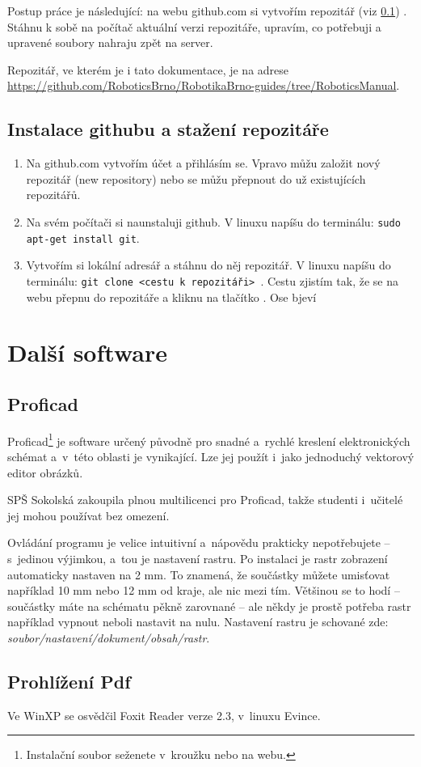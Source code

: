 Postup práce je následující: na webu github.com si vytvořím repozitář (viz \ref{instal_github}) . Stáhnu k sobě na počítač aktuální verzi repozitáře, upravím, co potřebuji a upravené soubory nahraju zpět na server. 

Repozitář, ve kterém je i tato dokumentace, je na adrese 
\url{https://github.com/RoboticsBrno/RobotikaBrno-guides/tree/RoboticsManual}.  


\subsection{Instalace githubu a stažení repozitáře} \label{instal_github}

\begin{enumerate}
	\item Na github.com vytvořím účet a přihlásím se. Vpravo můžu založit nový repozitář (new repository) nebo se můžu přepnout do už existujících repozitářů. 
	
	\item Na svém počítači si naunstaluji github. V linuxu napíšu do terminálu: {\tt sudo apt-get install git}.  
	
	\item Vytvořím si lokální adresář a stáhnu do něj repozitář. V linuxu napíšu do terminálu: {\tt git clone <cestu k repozitáři> }. 
	Cestu zjistím tak, že se na webu přepnu do repozitáře a kliknu na tlačítko . Ose bjeví 
\end{enumerate}


 
\section{Další software}

\subsection{Proficad}

Proficad\footnote{Instalační soubor seženete v~kroužku nebo na webu.} 
je software určený původně pro snadné a~rychlé kreslení elektronických schémat a~v~této oblasti je vynikající. 
Lze jej použít i~jako jednoduchý vektorový editor obrázků. 

SPŠ Sokolská zakoupila plnou multilicenci pro Proficad, takže studenti i~učitelé jej mohou používat bez omezení. 

Ovládání programu je velice intuitivní a~nápovědu prakticky nepotřebujete -- s~jedinou výjimkou, a~tou je nastavení rastru. 
Po instalaci je rastr zobrazení automaticky nastaven na 2 mm. To znamená, že součástky 
můžete umisťovat například 10 mm nebo 12 mm od kraje, ale nic mezi tím. 
Většinou se to hodí -- součástky máte na schématu pěkně zarovnané -- ale 
někdy je prostě potřeba rastr například vypnout neboli nastavit na nulu. 
Nastavení rastru je schované zde:  {\it soubor/nastavení/dokument/obsah/rastr}.

\subsection{Prohlížení Pdf}

Ve WinXP se osvědčil Foxit Reader verze 2.3, v~linuxu Evince.  

